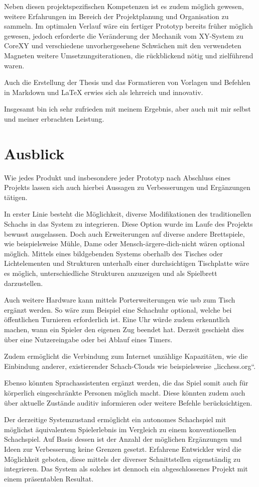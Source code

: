 Neben diesen projektspezifischen Kompetenzen ist es zudem möglich
gewesen, weitere Erfahrungen im Bereich der Projektplanung und
Organisation zu sammeln. Im optimalen Verlauf wäre ein fertiger Prototyp
bereits früher möglich gewesen, jedoch erforderte die Veränderung der
Mechanik vom XY-System zu CoreXY und verschiedene unvorhergesehene
Schwächen mit den verwendeten Magneten weitere Umsetzungsiterationen,
die rückblickend nötig und zielführend waren.

Auch die Erstellung der Thesis und das Formatieren von Vorlagen und
Befehlen in Markdown und LaTeX erwies sich als lehrreich und innovativ.

Insgesamt bin ich sehr zufrieden mit meinem Ergebnis, aber auch mit mir
selbst und meiner erbrachten Leistung.

\hypertarget{ausblick}{%
\section{Ausblick}\label{ausblick}}

Wie jedes Produkt und insbesondere jeder Prototyp nach Abschluss eines
Projekts lassen sich auch hierbei Aussagen zu Verbesserungen und
Ergänzungen tätigen.

In erster Linie besteht die Möglichkeit, diverse Modifikationen des
traditionellen Schachs in das System zu integrieren. Diese Option wurde
im Laufe des Projekts bewusst ausgelassen. Doch auch Erweiterungen auf
diverse andere Brettspiele, wie beispielsweise Mühle, Dame oder
Mensch-ärgere-dich-nicht wären optional möglich. Mittels eines
bildgebenden Systems oberhalb des Tisches oder Lichtelementen und
Strukturen unterhalb einer durchsichtigen Tischplatte wäre es möglich,
unterschiedliche Strukturen anzuzeigen und als Spielbrett darzustellen.

Auch weitere Hardware kann mittels Porterweiterungen wie \gls{usb} zum
Tisch ergänzt werden. So wäre zum Beispiel eine Schachuhr optional,
welche bei öffentlichen Turnieren erforderlich ist. Eine Uhr würde zudem
erkenntlich machen, wann ein Spieler den eigenen Zug beendet hat.
Derzeit geschieht dies über eine Nutzereingabe oder bei Ablauf eines
Timers.

Zudem ermöglicht die Verbindung zum Internet unzählige Kapazitäten, wie
die Einbindung anderer, existierender Schach-Clouds wie beispielsweise
„licchess.org``.

Ebenso könnten Sprachassistenten ergänzt werden, die das Spiel somit
auch für körperlich eingeschränkte Personen möglich macht. Diese könnten
zudem auch über aktuelle Zustände auditiv informieren oder weitere
Befehle berücksichtigen.

Der derzeitige Systemzustand ermöglicht ein autonomes Schachspiel mit
möglichst äquivalentem Spielerlebnis im Vergleich zu einem
konventionellen Schachspiel. Auf Basis dessen ist der Anzahl der
möglichen Ergänzungen und Ideen zur Verbesserung keine Grenzen gesetzt.
Erfahrene Entwickler wird die Möglichkeit geboten, diese mittels der
diverser Schnittstellen eigenständig zu integrieren. Das System als
solches ist dennoch ein abgeschlossenes Projekt mit einem präsentablen
Resultat.


